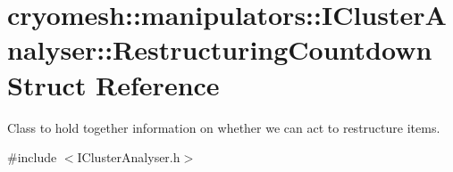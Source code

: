 \hypertarget{structcryomesh_1_1manipulators_1_1IClusterAnalyser_1_1RestructuringCountdown}{\section{cryomesh\-:\-:manipulators\-:\-:\-I\-Cluster\-Analyser\-:\-:\-Restructuring\-Countdown \-Struct \-Reference}
\label{structcryomesh_1_1manipulators_1_1IClusterAnalyser_1_1RestructuringCountdown}
}


\-Class to hold together information on whether we can act to restructure items.  




{\ttfamily \#include $<$\-I\-Cluster\-Analyser.\-h$>$}

